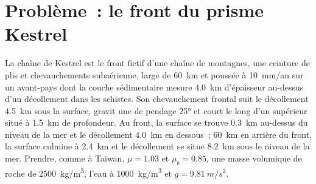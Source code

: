 \section{Problème~: le front du prisme Kestrel}

\begin{problem}
\label{pb:b3:orogenic-wedges:1}
La chaîne de Kestrel est le front fictif d'une chaîne de montagnes, une
ceinture de plis et chevauchements subaérienne, large de \qty{60}{km} et poussée à \qty{10}{mm/an} sur un
avant-pays dont la couche sédimentaire mesure \qty{4.0}{km} d'épaisseur au-dessus d'un
décollement dans les schistes. Son chevauchement frontal suit le décollement \qty{4.5}{km} sous la
surface, gravit une  de pendage \ang{25} et court le long d'un  supérieur
situé à \qty{1.5}{km} de profondeur. Au front, la surface se trouve \qty{0.3}{km} au-dessus du
niveau de la mer et le décollement \qty{4.0}{km} en dessous~; \qty{60}{km} en arrière du
front, la surface culmine à \qty{2.4}{km} et le décollement se situe
\qty{8.2}{km} sous le niveau de la mer. Prendre, comme à Taïwan, $\mu = 1.03$ et $\mu_b =
0.85$, une masse volumique de roche de \qty{2500}{kg/m^3}, l'eau à \qty{1000}{kg/m^3} et
$g = \qty{9.81}{m/s^2}$.


\end{problem}

